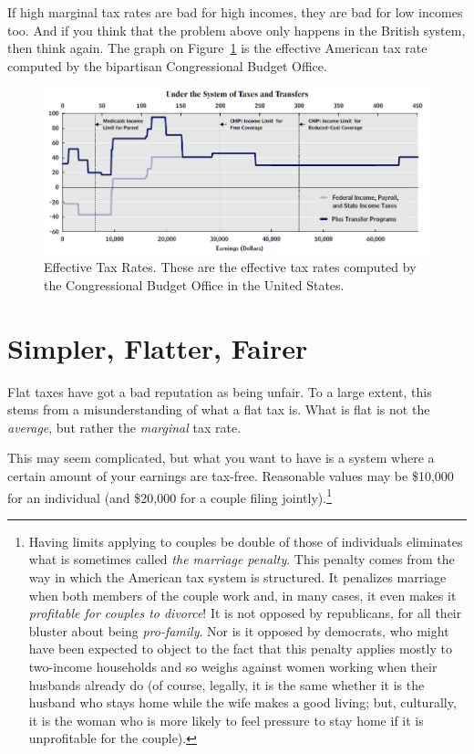 If high marginal tax rates are bad for high incomes, they are bad for low
incomes too. And if you think that the problem above only happens in the
British system, then think again. The graph on
Figure~\ref{fig:cbo-effective-tax-rate} is the effective American tax rate
computed by the bipartisan Congressional Budget Office.

\begin{figure}
\begin{center}
\includegraphics[width=.8\textwidth]{images/cbo-effective-tax-rate.png}
\end{center}
\caption{Effective Tax Rates. These are the effective tax rates computed by the
Congressional Budget Office in the United States.}
\label{fig:cbo-effective-tax-rate}
\end{figure}

\section{Simpler, Flatter, Fairer}

Flat taxes have got a bad reputation as being unfair. To a large extent, this
stems from a misunderstanding of what a flat tax is. What is flat is not the
\emph{average}, but rather the \emph{marginal} tax rate.

This may seem complicated, but what you want to have is a system where a
certain amount of your earnings are tax-free. Reasonable values may be \$10,000
for an individual (and \$20,000 for a couple filing jointly).\footnote{Having
limits applying to couples be double of those of individuals eliminates what is
sometimes called \emph{the marriage penalty}. This penalty comes from the way
in which the American tax system is structured. It penalizes marriage when both
members of the couple work and, in many cases, it even makes it
\emph{profitable for couples to divorce}! It is not opposed by republicans, for
all their bluster about being \emph{pro-family}. Nor is it opposed by
democrats, who might have been expected to object to the fact that this penalty
applies mostly to two-income households and so weighs against women working
when their husbands already do (of course, legally, it is the same whether it
is the husband who stays home while the wife makes a good living; but,
culturally, it is the woman who is more likely to feel pressure to stay home if
it is unprofitable for the couple).}

